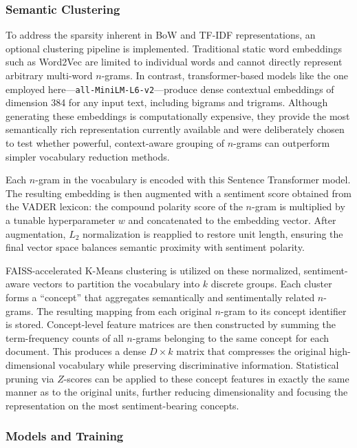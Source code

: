 \documentclass[a4paper,fleqn]{cas-dc}
\newcommand{\zscore}{Z}
\newcommand{\kconcepts}{k}
\newcommand{\weightparam}{w}
\begin{document}
\subsubsection{Semantic Clustering} \label{sec:semantic_clustering}

To address the sparsity inherent in BoW and TF-IDF representations, an optional clustering pipeline is implemented. Traditional static word embeddings such as Word2Vec are limited to individual words and cannot directly represent arbitrary multi-word $n$-grams. In contrast, transformer-based models like the one employed here---\texttt{all-MiniLM-L6-v2}---produce dense contextual embeddings of dimension 384 for any input text, including bigrams and trigrams. Although generating these embeddings is computationally expensive, they provide the most semantically rich representation currently available and were deliberately chosen to test whether powerful, context-aware grouping of $n$-grams can outperform simpler vocabulary reduction methods.

Each $n$-gram in the vocabulary is encoded with this Sentence Transformer model. The resulting embedding is then augmented with a sentiment score obtained from the VADER lexicon: the compound polarity score of the $n$-gram is multiplied by a tunable hyperparameter $\weightparam$ and concatenated to the embedding vector. After augmentation, $L_2$ normalization is reapplied to restore unit length, ensuring the final vector space balances semantic proximity with sentiment polarity.

FAISS-accelerated K-Means clustering is utilized on these normalized, sentiment-aware vectors to partition the vocabulary into $\kconcepts$ discrete groups. Each cluster forms a ``concept'' that aggregates semantically and sentimentally related $n$-grams. The resulting mapping from each original $n$-gram to its concept identifier is stored. Concept-level feature matrices are then constructed by summing the term-frequency counts of all $n$-grams belonging to the same concept for each document. This produces a dense $D \times \kconcepts$ matrix that compresses the original high-dimensional vocabulary while preserving discriminative information. Statistical pruning via $\zscore$-scores can be applied to these concept features in exactly the same manner as to the original units, further reducing dimensionality and focusing the representation on the most sentiment-bearing concepts.

\subsubsection{Models and Training} \label{sec:models}
\end{document}
